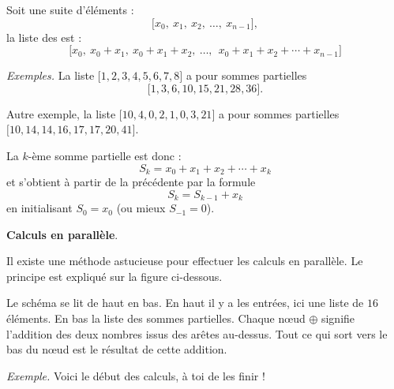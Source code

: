 \documentclass[11pt,class=report,crop=false]{standalone}
\begin{document}
\begin{cours}

Soit une suite d'éléments :
$$\big[x_0,\ x_1,\ x_2,\ \ldots,\ x_{n-1}\big],$$
la liste des  est :
$$\big[x_0,\ x_0+x_1,\ x_0+x_1+x_2,\ \ldots,\ \ x_0+x_1+x_2 + \cdots + x_{n-1}\big]$$

\emph{Exemples.} La liste $\big[1, 2, 3, 4, 5, 6, 7, 8\big]$
a pour sommes partielles 
$$\big[1, 3, 6, 10, 15, 21, 28, 36 \big].$$

Autre exemple, la liste $\big[10,4,0,2,1,0,3,21\big]$
a pour sommes partielles $\big[10, 14, 14, 16, 17, 17, 20, 41\big]$.

\bigskip

La $k$-ème somme partielle est donc :
$$S_k = x_0+x_1+x_2+\cdots+x_k$$
et s'obtient à partir de la précédente par la formule
$$S_k = S_{k-1} + x_k$$
en initialisant $S_0 = x_0$ (ou mieux $S_{-1} = 0$).


\textbf{Calculs en parallèle}.

Il existe une méthode astucieuse pour effectuer les calculs en parallèle. Le principe est expliqué sur la figure ci-dessous.

Le schéma se lit de haut en bas. En haut il y a les entrées, ici une liste de $16$ éléments. En bas la liste des sommes partielles. 
Chaque n\oe ud $\oplus$ signifie l'addition des deux nombres issus des arêtes au-dessus. Tout ce qui sort vers le bas du n\oe ud est le résultat de cette addition.


\emph{Exemple.}
Voici le début des calculs, à toi de les finir !



\end{cours}


\end{document}
